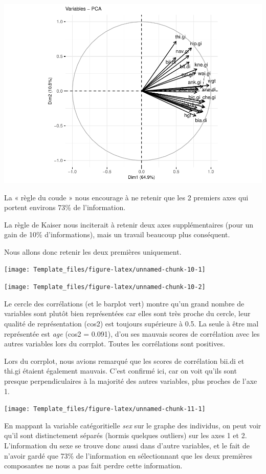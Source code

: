 \documentclass[
]{article}
\begin{document}
\begin{center}\includegraphics[width=0.33\linewidth]{Template_files/figure-latex/unnamed-chunk-9-1} \end{center}

La « règle du coude » nous encourage à ne retenir que les 2 premiers
axes qui portent environs 73\% de l'information.

La règle de Kaiser nous inciterait à retenir deux axes supplémentaires
(pour un gain de 10\% d'informations), mais un travail beaucoup plus
conséquent.

Nous allons donc retenir les deux premières uniquement.

\begin{center}\texttt{[image: Template\_files/figure-latex/unnamed-chunk-10-1]} \end{center}

\begin{center}\texttt{[image: Template\_files/figure-latex/unnamed-chunk-10-2]} \end{center}

Le cercle des corrélations (et le barplot vert) montre qu'un grand
nombre de variables sont plutôt bien représentées car elles sont très
proche du cercle, leur qualité de représentation (cos2) est toujours
supérieure à 0.5. La seule à être mal représentée est \emph{age} (cos2 =
0.091), d'ou ses mauvais scores de corrélation avec les autres variables
lors du corrplot. Toutes les corrélations sont positives.

Lors du corrplot, nous avions remarqué que les scores de corrélation
bii.di et thi.gi étaient également mauvais. C'est confirmé ici, car on
voit qu'ils sont presque perpendiculaires à la majorité des autres
variables, plus proches de l'axe 1.

\begin{center}\texttt{[image: Template\_files/figure-latex/unnamed-chunk-11-1]} \end{center}

En mappant la variable catégoritielle \emph{sex} sur le graphe des
individus, on peut voir qu'il sont distinctement séparés (hormis
quelques outliers) sur les axes 1 et 2. L'information du sexe se trouve
donc aussi dans d'autre variables, et le fait de n'avoir gardé que 73\%
de l'information en sélectionnant que les deux premières composantes ne
nous a pas fait perdre cette information.
\end{document}
